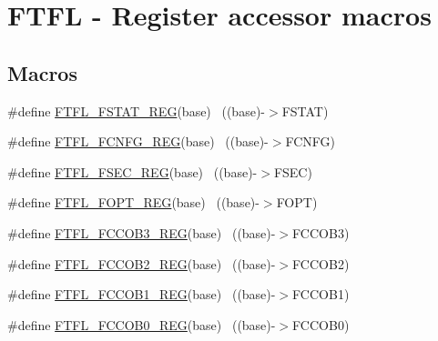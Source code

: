 \hypertarget{group___f_t_f_l___register___accessor___macros}{}\section{F\+T\+FL -\/ Register accessor macros}
\label{group___f_t_f_l___register___accessor___macros}
\subsection*{Macros}
\begin{DoxyCompactItemize}
\item 
\#define \hyperlink{group___f_t_f_l___register___accessor___macros_ga61843e4cd8d028e949b2bcef7580f03d}{F\+T\+F\+L\+\_\+\+F\+S\+T\+A\+T\+\_\+\+R\+EG}(base)                                      ~((base)-\/$>$F\+S\+T\+AT)
\item 
\#define \hyperlink{group___f_t_f_l___register___accessor___macros_gad717b12e5cd4f849ad44ccc811a25685}{F\+T\+F\+L\+\_\+\+F\+C\+N\+F\+G\+\_\+\+R\+EG}(base)                                      ~((base)-\/$>$F\+C\+N\+FG)
\item 
\#define \hyperlink{group___f_t_f_l___register___accessor___macros_ga24c533d0a36f2a369d16c5801fa99c90}{F\+T\+F\+L\+\_\+\+F\+S\+E\+C\+\_\+\+R\+EG}(base)                                        ~((base)-\/$>$F\+S\+EC)
\item 
\#define \hyperlink{group___f_t_f_l___register___accessor___macros_gaa19b55e321560f11e71f7cba374dbe7e}{F\+T\+F\+L\+\_\+\+F\+O\+P\+T\+\_\+\+R\+EG}(base)                                        ~((base)-\/$>$F\+O\+PT)
\item 
\#define \hyperlink{group___f_t_f_l___register___accessor___macros_gafb6ad80128940470498489c7ca3c1f6b}{F\+T\+F\+L\+\_\+\+F\+C\+C\+O\+B3\+\_\+\+R\+EG}(base)                                    ~((base)-\/$>$F\+C\+C\+O\+B3)
\item 
\#define \hyperlink{group___f_t_f_l___register___accessor___macros_ga12697c398db5990129d2f65ced25b3cc}{F\+T\+F\+L\+\_\+\+F\+C\+C\+O\+B2\+\_\+\+R\+EG}(base)                                    ~((base)-\/$>$F\+C\+C\+O\+B2)
\item 
\#define \hyperlink{group___f_t_f_l___register___accessor___macros_gab99efa5cba6e3a97a61634ff367e38d2}{F\+T\+F\+L\+\_\+\+F\+C\+C\+O\+B1\+\_\+\+R\+EG}(base)                                    ~((base)-\/$>$F\+C\+C\+O\+B1)
\item 
\#define \hyperlink{group___f_t_f_l___register___accessor___macros_ga6e99a315254057699b17fca8421e31f8}{F\+T\+F\+L\+\_\+\+F\+C\+C\+O\+B0\+\_\+\+R\+EG}(base)                                    ~((base)-\/$>$F\+C\+C\+O\+B0)

\end{DoxyCompactItemize}
